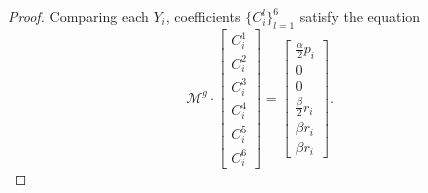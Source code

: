 \documentclass[11pt,letterpaper]{amsart}
\newcommand{\mM}{\mathcal{M}}
\theoremstyle{definition}
\theoremstyle{remark}
\numberwithin{equation}{section}
\begin{document}
\begin{proof}
Comparing each $Y_i$, coefficients $\{C^l_i\}_{l=1}^6$ satisfy the equation
\begin{equation}\label{eq:C}
    \mM^{g}\cdot \begin{bmatrix}
      C^1_i\\
        C^2_i\\
        C^3_i\\
        C^4_i\\
        C^5_i\\
        C^6_i
    \end{bmatrix}=\begin{bmatrix}
        \frac{\alpha}{2}p_i\\
        0\\
        0\\
        \frac{\beta}{2}r_i\\
        \beta r_i\\
        \beta r_i
    \end{bmatrix}.
\end{equation}


\end{proof}
\end{document}

